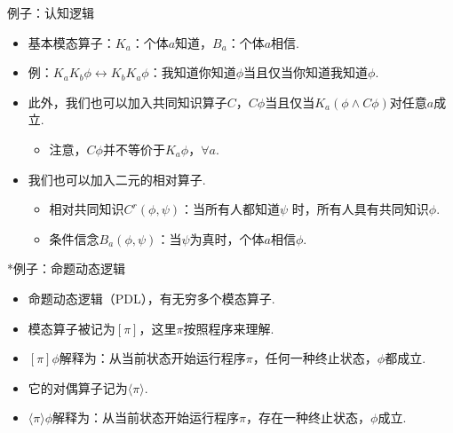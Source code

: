     
    {例子：认知逻辑}
    \begin{itemize}
        \item 基本模态算子：$K_a$：个体$a$知道，$B_a$：个体$a$相信.
        \item 例：$K_aK_b\phi\leftrightarrow K_bK_a\phi$：我知道你知道$\phi$当且仅当你知道我知道$\phi$.
        \item 此外，我们也可以加入共同知识算子$C$，$C \phi$当且仅当$K_a(\phi\wedge C\phi)$对任意$a$成立.
        \begin{itemize}
            \item 注意，$C\phi$并不等价于$K_a\phi$，$\forall a$.
        \end{itemize}
        \item 我们也可以加入二元的相对算子.
        \begin{itemize}
            \item 相对共同知识$C^r(\phi,\psi)$：当所有人都知道$\psi$        时，所有人具有共同知识$\phi$.
            \item 条件信念$B_a(\phi,\psi)$：当$\psi$为真时，个体$a$相信$\phi$.
        \end{itemize} 
    \end{itemize}
    
    
    {*例子：命题动态逻辑}
    \begin{itemize}
        \item 命题动态逻辑（PDL），有无穷多个模态算子.
        \item 模态算子被记为$[\pi]$，这里$\pi$按照程序来理解.
        \item $[\pi]\phi$解释为：从当前状态开始运行程序$\pi$，任何一种终止状态，$\phi$都成立.
        \item 它的对偶算子记为$\langle\pi\rangle$.
        \item $\langle\pi\rangle\phi$解释为：从当前状态开始运行程序$\pi$，存在一种终止状态，$\phi$成立.
    \end{itemize}
    
